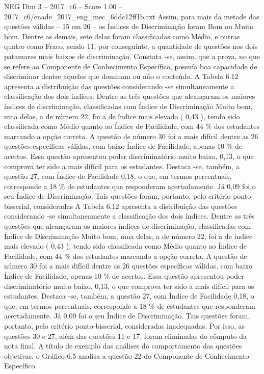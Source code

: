\begin{textsample}{NEG Dim 3 – 2017\_c6 – Score 1.00 – 2017\_c6/enade\_2017\_eng\_mec\_6ddc12ff1b.txt}
Assim, para mais da metade das questões válidas – 15 em 26 – os Índices de Discriminação foram Bom ou Muito bom.
Dentre as demais, sete delas foram classificadas como Médio, e outras quatro como Fraco, sendo 11, por conseguinte, a quantidade de questões nos dois patamares mais baixos de discriminação.
Constata -se, assim, que a prova, no que se refere ao Componente de Conhecimento Específico, possuía boa capacidade de discriminar dentre aqueles que dominam ou não o conteúdo.
A Tabela 6.12 apresenta a distribuição das questões considerando -se simultaneamente a classificação dos dois índices.
Dentre as três questões que alcançaram os maiores índices de discriminação, classificadas com Índice de Discriminação Muito bom, uma delas, a de número 22, foi a de índice mais elevado ( 0,43 ), tendo sido classificada como Médio quanto ao Índice de Facilidade, com 44 \% dos estudantes marcando a opção correta.
A questão de número 30 foi a mais difícil dentre as 26 questões específicas válidas, com baixo Índice de Facilidade, apenas 10 \% de acertos.
Essa questão apresentou poder discriminatório muito baixo, 0,13, o que comprova ter sido a mais difícil para os estudantes.
Destaca -se, também, a questão 27, com Índice de Facilidade 0,18, o que, em termos percentuais, corresponde a 18 \% de estudantes que responderam acertadamente.
Já 0,09 foi o seu Índice de Discriminação.
Tais questões foram, portanto, pelo critério ponto-bisserial, consideradas A Tabela 6.12 apresenta a distribuição das questões considerando -se simultaneamente a classificação dos dois índices.
Dentre as três questões que alcançaram os maiores índices de discriminação, classificadas com Índice de Discriminação Muito bom, uma delas, a de número 22, foi a de índice mais elevado ( 0,43 ), tendo sido classificada como Médio quanto ao Índice de Facilidade, com 44 \% dos estudantes marcando a opção correta.
A questão de número 30 foi a mais difícil dentre as 26 questões específicas válidas, com baixo Índice de Facilidade, apenas 10 \% de acertos.
Essa questão apresentou poder discriminatório muito baixo, 0,13, o que comprova ter sido a mais difícil para os estudantes.
Destaca -se, também, a questão 27, com Índice de Facilidade 0,18, o que, em termos percentuais, corresponde a 18 \% de estudantes que responderam acertadamente.
Já 0,09 foi o seu Índice de Discriminação.
Tais questões foram, portanto, pelo critério ponto-bisserial, consideradas inadequadas.
Por isso, as questões 30 e 27, além das questões 11 e 17, foram eliminadas do cômputo da nota final.
A título de exemplo das análises do comportamento das questões objetivas, o Gráfico 6.5 analisa a questão 22 do Componente de Conhecimento Específico.

\end{textsample}
